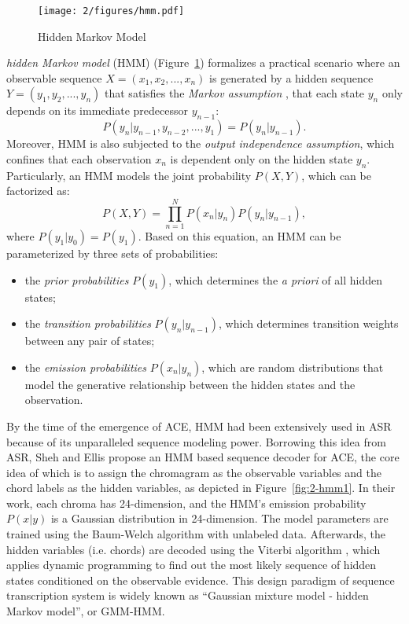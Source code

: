 \begin{figure}[htb]
\centering
\texttt{[image: 2/figures/hmm.pdf]}
\caption{Hidden Markov Model}
\label{fig:2-hmm}
\end{figure}
\textit{hidden Markov model} (HMM) (Figure~\ref{fig:2-hmm}) formalizes a practical scenario where an observable sequence $X=(x_1,x_2,...,x_n)$ is generated by a hidden sequence $Y = (y_1,y_2,...,y_n)$ that satisfies the {\it Markov assumption} \cite{gardiner1985handbook}, that each state $y_n$ only depends on its immediate predecessor $y_{n-1}$:
\begin{equation}\label{eq:2-mp}
P(y_n|y_{n-1},y_{n-2},...,y_1) = P(y_n|y_{n-1}).
\end{equation}
Moreover, HMM is also subjected to the {\it output independence assumption}, which confines that each observation $x_n$ is dependent only on the hidden state $y_n$. Particularly, an HMM models the joint probability $P(X,Y)$, which can be factorized as:
\begin{equation}\label{eq:2-hmm}
P(X,Y) = \prod_{n=1}^N P(x_n|y_n)P(y_n|y_{n-1}),
\end{equation}
where $P(y_1|y_0)=P(y_1)$. Based on this equation, an HMM can be parameterized by three sets of probabilities:
\begin{itemize}
\item the {\it prior probabilities} $P(y_1)$, which determines the {\it a priori} of all hidden states;
\item the {\it transition probabilities} $P(y_n|y_{n-1})$, which determines transition weights between any pair of states;
\item the {\it emission probabilities} $P(x_n|y_n)$, which are random distributions that model the generative relationship between the hidden states and the observation.
\end{itemize}
By the time of the emergence of ACE, HMM had been extensively used in ASR \cite{rabiner1989tutorial,huang1990hidden} because of its unparalleled sequence modeling power. Borrowing this idea from ASR, Sheh and Ellis \cite{sheh2003chord} propose an HMM based sequence decoder for ACE, the core idea of which is to assign the chromagram as the observable variables and the chord labels as the hidden variables, as depicted in Figure~\ref{fig:2-hmm1}. In their work, each chroma has 24-dimension, and the HMM's emission probability $P(x|y)$ is a Gaussian distribution in 24-dimension. The model parameters are trained using the Baum-Welch algorithm \cite{baum1970maximization} with unlabeled data. Afterwards, the hidden variables (i.e. chords) are decoded using the Viterbi algorithm \cite{rabiner1989tutorial}, which applies dynamic programming to find out the most likely sequence of hidden states conditioned on the observable evidence. This design paradigm of sequence transcription system is widely known as ``Gaussian mixture model - hidden Markov model'', or GMM-HMM.
